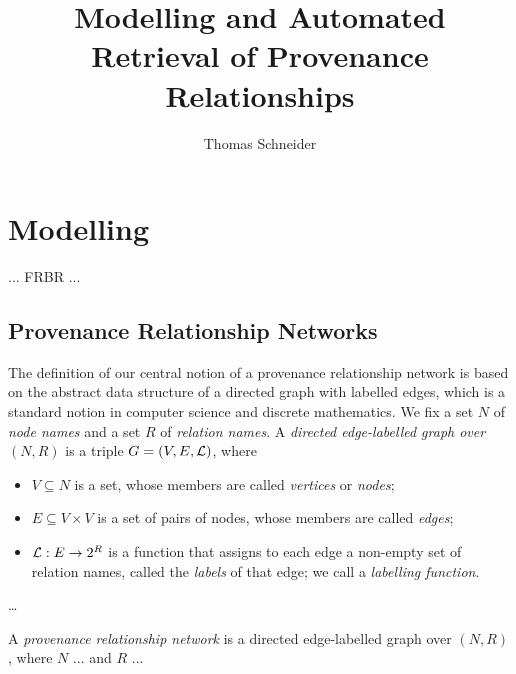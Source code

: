 \documentclass[10pt,DIV=11,a4paper]{scrartcl}
\title{Modelling and Automated Retrieval of Provenance Relationships}
\author{Thomas Schneider}
\begin{document}
  \maketitle

  \section{Modelling}
  
  ... FRBR ...
  
  \subsection{Provenance Relationship Networks}
  
  The definition of our central notion of a provenance relationship network
  is based on the abstract data structure of a directed graph with labelled edges,
  which is a standard notion in computer science and discrete mathematics.
  We fix a set $N$ of \emph{node names} and a set $R$ of \emph{relation names}.
  A \emph{directed edge-labelled graph over $(N,R)$} is a triple $G = (V,E,\mathcal{L})$,
  where
  \begin{itemize}
    \item
      $V \subseteq N$ is a set, whose members are called \emph{vertices} or \emph{nodes};
    \item 
      $E \subseteq V \times V$ is a set of pairs of nodes, whose members are called \emph{edges};
    \item
      $\mathcal{L} : E \to 2^R$ is a function that assigns to each edge a non-empty set of relation names,
      called the \emph{labels} of that edge; we call \Lmc a \emph{labelling function}.
  \end{itemize}
  \dots{}
  
  A \emph{provenance relationship network} is a directed edge-labelled graph over $(N,R)$,
  where $N$ ... and $R$ ... 
  
     


%  
%  
\end{document}
